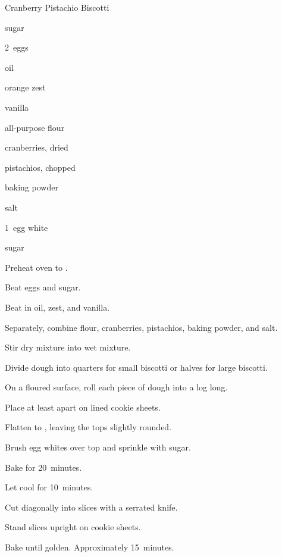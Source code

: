 \begin{recipe}{Cranberry Pistachio Biscotti}{}{}

\begin{ingredients}
\item \C{\threequarter} sugar
\item 2~eggs
\item \C{\quarter} oil
\item \tp{1\half} orange zest
\item \tp{1\half} vanilla
\item {} all-purpose flour
\item \C{\half} cranberries, dried
\item \C{\half} pistachios, chopped
\item {} baking powder
\item \tp{\quarter} salt
\item 1~egg white
\item {} sugar
\end{ingredients}

\begin{directions}
\item Preheat oven to .
\item Beat eggs and \C{\threequarter} sugar.
\item Beat in oil, zest, and vanilla.
\item Separately, combine flour, cranberries, pistachios, baking powder, and salt.
\item Stir dry mixture into wet mixture.
\item Divide dough into quarters for small biscotti or halves for large biscotti.
\item On a floured surface, roll each piece of dough into a log  long.
\item Place at least  apart on lined cookie sheets.
\item Flatten to \inch{\threequarter}, leaving the tops slightly rounded.
\item Brush egg whites over top and sprinkle with sugar.
\item Bake for 20~minutes.
\item Let cool for 10~minutes.
\item Cut diagonally into \inch{\half} slices with a serrated knife.
\item Stand slices upright on cookie sheets.
\item Bake until golden. Approximately 15~minutes.
\end{directions}

\end{recipe}
